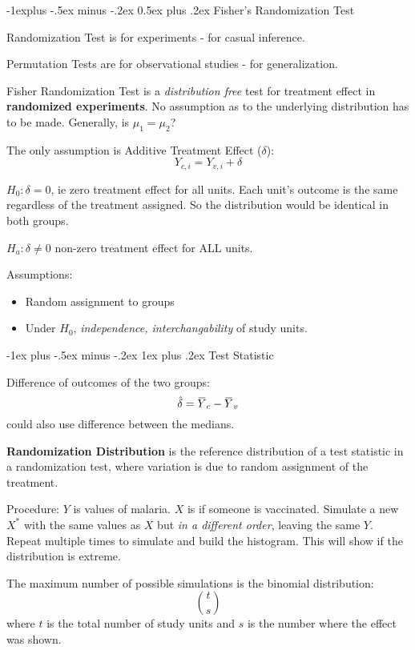 \documentclass[10pt,landscape]{article}
\makeatletter
\renewcommand{\subsection}{\@startsection{subsection}{2}{0mm}%
                                {-1explus -.5ex minus -.2ex}%
                                {0.5ex plus .2ex}%
                                {\normalfont\normalsize\bfseries}}
\renewcommand{\subsubsection}{\@startsection{subsubsection}{3}{0mm}%
                                {-1ex plus -.5ex minus -.2ex}%
                                {1ex plus .2ex}%
                                {\normalfont\small\bfseries}}
\newcommand{\overbar}[1]{\mkern 1.5mu\overline{\mkern-1.5mu#1\mkern-1.5mu}\mkern 1.5mu}
\makeatother
\begin{document}
\begin{multicols*}{3}
\subsection{Fisher's Randomization Test}

Randomization Test is for experiments - for casual inference.

Permutation Tests are for observational studies - for generalization.

Fisher Randomization Test is a \textit{distribution free} test for treatment effect in \textbf{randomized experiments}. No assumption as to the underlying distribution has to be made. Generally, is $\mu_1 = \mu_2$? 

The only assumption is Additive Treatment Effect ($\delta$):
\[
Y_{c,i} = Y_{v,i} + \delta
\]

$H_0: \delta = 0$, ie  zero treatment effect for all units. Each unit's outcome is the same regardless of the treatment assigned. So the distribution would be identical in both groups.

$H_a: \delta \neq 0$ non-zero treatment effect for ALL units. 

Assumptions:
\begin{itemize}
\item Random assignment to groups
\item Under $H_0$, \textit{independence, interchangability} of study units. 
\end{itemize}

\subsubsection{Test Statistic}

Difference of outcomes of the two groups:
\[
\hat{\delta} = \overbar{Y}_c - \overbar{Y}_v
\]
could also use difference between the medians.

\textbf{Randomization Distribution} is the reference distribution of a test statistic in a randomization test,
where variation is due to random assignment of the treatment.

Procedure:
$Y$ is values of malaria. $X$ is if someone is vaccinated. Simulate a new $X^*$ with the same values as $X$ but \textit{in a different order}, leaving the same $Y$. Repeat multiple times to simulate and build the histogram. This will show if the distribution is extreme.

The maximum number of possible simulations is the binomial distribution:
\[{t \choose s}\]
where $t$ is the total number of study units and $s$ is the number where the effect was shown.


\end{multicols*}
\end{document}
